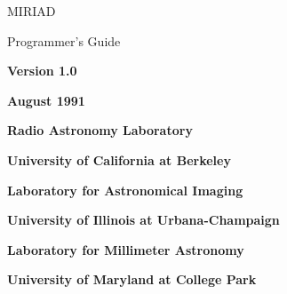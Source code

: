 %
\phantom{MIRIAD}

\nopagenumbers
\vskip 0.5in \centerline{\biggest MIRIAD}
\vskip 0.5in \centerline{\biggest Programmer's Guide}
\vskip 1.0in \centerline{\bf Version 1.0}
\vskip 0.25in\centerline{\bf August 1991}
\vfill

\centerline{\bf Radio Astronomy Laboratory}
\centerline{\bf University of California at Berkeley}
\vskip 0.25in
\centerline{\bf Laboratory for Astronomical Imaging}
\centerline{\bf University of Illinois at Urbana-Champaign}
\vskip 0.25in
\centerline{\bf Laboratory for Millimeter Astronomy}
\centerline{\bf University of Maryland at College Park}
\vskip 0.25in
\eject

